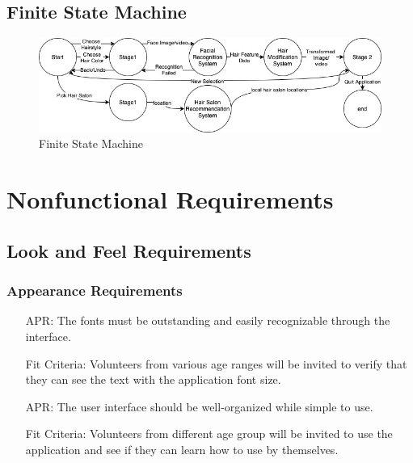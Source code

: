 \documentclass[12pt]{article}
\newcounter{reqnum} %
\newcounter{aprreqnum} %
\begin{document}
\subsection{Finite State Machine}
\begin{figure}[h!]
\begin{center}
 \includegraphics[width=1\textwidth]{fsm_1}
\caption{Finite State Machine}
\end{center}
\end{figure}


\section{Nonfunctional Requirements}

\subsection{Look and Feel Requirements}
\subsubsection{Appearance Requirements}
\begin{itemize}
    \item[APR\refstepcounter{aprreqnum}\theaprreqnum \label{R_Inputs}:] The fonts must be outstanding and easily recognizable through the interface.
    \item[] Fit Criteria: Volunteers from various age ranges will be invited to verify that they can see the text with the application font size.
    \item[APR\refstepcounter{aprreqnum}\theaprreqnum \label{R_Inputs}:] The user interface should be well-organized while simple to use. 
    \item[] Fit Criteria: Volunteers from different age group will be invited to use the application and see if they can learn how to use by themselves. 
\end{itemize}
\end{document}
